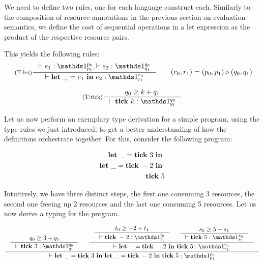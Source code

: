 We need to define two rules, one for each language construct each. Similarly to the composition of resource-annotations in the previous section on evaluation semantics, we define the cost of sequential operations in a let expression as the product of the respective resource pairs.

This yields the following rules:
\[
   \label{def:tr-let-4}
   \vcenter{\hbox{
      \inference[(T:let)]
      {\typing{}{e_1}{\ratype{\unit}{p_0}{p_1}},  \typing{}{e_2}{\ratype{\unit}{q_0}{q_1}}}
      {\typing{}{\letexp{\_}{e_1}{e_2}}{\ratype{\unit}{r_0}{r_1}}}
}}\qquad \begin{aligned}
      (r_0, r_1) = (p_0, p_1) \sequence (q_0, q_1)
   \end{aligned}
\]

\begin{remark}
\end{remark}

\[
   \label{def:tr-tick-4}
   \inference[(T:tick)]
   {q_0 \geq k + q_1}
   {\typing{}{\tick{k}}{\ratype{\unit}{q_0}{q_1}}}
\]


Let us now perform an exemplary type derivation for a simple program, using the type rules we just introduced, to get a better understanding of how the definitions orchestrate together. For this, consider the following program:

\begin{example}
   \begin{align*}
   \mathbf{let}~\_ = \mathbf{tick}~3~\mathbf{in}~ \\
   \mathbf{let}~\_ = \mathbf{tick}~-2~\mathbf{in}~ \\
   \mathbf{tick}~5
   \end{align*}
\end{example}

Intuitively, we have three distinct steps, the first one consuming 3 resources, the second one freeing up 2 resources and the last one consuming 5 resources. Let us now derive a typing for the program.

\[
   \inference
   {
      \inference
      {q_0 \geq 3 + q_1}
      {\typing{}{\tick{3}}{\ratype{\unit}{q_0}{q_1}}}
       &
      \inference
      {
         \inference
         {t_0 \geq -2 + t_1}
         {\typing{}{\tick{-2}}{\ratype{\unit}{t_0}{t_1}}}
          &
         \inference
         {s_0 \geq 5 + s_1}
         {\typing{}{\tick{5}}{\ratype{\unit}{s_0}{s_1}}}
      }
      {\typing{}{\letexp{\_}{\tick{-2}}{\tick{5}}}{\ratype{\unit}{r_0}{r_1}}}
   }
   {\typing{}{\letexp{\_}{\tick{3}}{\letexp{\_}{\tick{-2}}{\tick{5}}}}{\ratype{\unit}{p_0}{p_1}}}
\]

